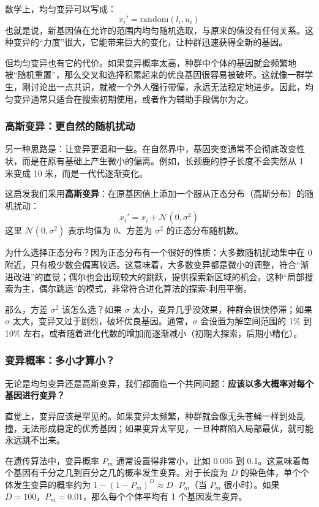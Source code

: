 \documentclass[lang=cn,zihao=-4,a4paper,fontset=windows]{beautybook}
\begin{document}
数学上，均匀变异可以写成：
\[
x_i' = \text{random}(l_i, u_i)
\]
也就是说，新基因值在允许的范围内均匀随机选取，与原来的值没有任何关系。这种变异的“力度”很大，它能带来巨大的变化，让种群迅速获得全新的基因。

但均匀变异也有它的代价。如果变异概率太高，种群中个体的基因就会频繁地被“随机重置”，那么交叉和选择积累起来的优良基因很容易被破坏。这就像一群学生，刚讨论出一点共识，就被一个外人强行带偏，永远无法稳定地进步。因此，均匀变异通常只适合在搜索初期使用，或者作为辅助手段偶尔为之。

\subsubsection{高斯变异：更自然的随机扰动}

另一种思路是：让变异更温和一些。在自然界中，基因突变通常不会彻底改变性状，而是在原有基础上产生微小的偏离。例如，长颈鹿的脖子长度不会突然从 1 米变成 10 米，而是一代代逐渐变化。

这启发我们采用\textbf{高斯变异}：在原基因值上添加一个服从正态分布（高斯分布）的随机扰动：
\[
x_i' = x_i + \mathcal{N}(0, \sigma^2)
\]
这里 $\mathcal{N}(0, \sigma^2)$ 表示均值为 0、方差为 $\sigma^2$ 的正态分布随机数。

为什么选择正态分布？因为正态分布有一个很好的性质：大多数随机扰动集中在 0 附近，只有极少数会偏离较远。这意味着，大多数变异都是微小的调整，符合“渐进改进”的直觉；偶尔也会出现较大的跳跃，提供探索新区域的机会。这种“局部搜索为主，偶尔跳远”的模式，非常符合进化算法的探索-利用平衡。

那么，方差 $\sigma^2$ 该怎么选？如果 $\sigma$ 太小，变异几乎没效果，种群会很快停滞；如果 $\sigma$ 太大，变异又过于剧烈，破坏优良基因。通常，$\sigma$ 会设置为解空间范围的 1\% 到 10\% 左右，或者随着进化代数的增加而逐渐减小（初期大探索，后期小精化）。

\subsubsection{变异概率：多小才算小？}

无论是均匀变异还是高斯变异，我们都面临一个共同问题：\textbf{应该以多大概率对每个基因进行变异？}

直觉上，变异应该是罕见的。如果变异太频繁，种群就会像无头苍蝇一样到处乱撞，无法形成稳定的优秀基因；如果变异太罕见，一旦种群陷入局部最优，就可能永远跳不出来。

在遗传算法中，变异概率 $P_m$ 通常设置得非常小，比如 0.005 到 0.1。这意味着每个基因有千分之几到百分之几的概率发生变异。对于长度为 $D$ 的染色体，单个个体发生变异的概率约为 $1 - (1-P_m)^D \approx D \cdot P_m$（当 $P_m$ 很小时）。如果 $D=100$，$P_m=0.01$，那么每个个体平均有 1 个基因发生变异。
\end{document}
